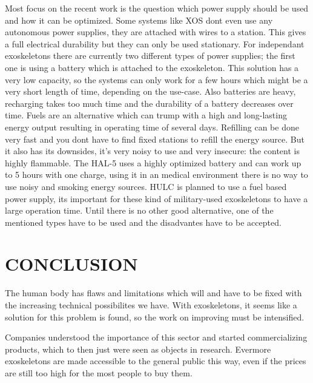 \documentclass[letterpaper, 10 pt, conference]{ieeeconf}  %
\begin{document}

Most focus on the recent work is the question which power supply should be used and how it can be optimized. Some systems like XOS dont even use any autonomous power supplies, they are attached with wires to a station. This gives a full electrical durability but they can only be used stationary. For independant exoskeletons there are currently two different types of power supplies; the first one is using a battery which is attached to the exoskeleton. This solution has a very low capacity, so the systems can only work for a few hours which might be a very short length of time, depending on the use-case. Also batteries are heavy, recharging takes too much time and the durability of a battery decreases over time. Fuels are an alternative which can trump with a high and long-lasting energy output resulting in operating time of several days. Refilling can be done very fast and you dont have to find fixed stations to refill the energy source. But it also has its downsides, it's very noisy to use and very insecure: the content is highly flammable. The HAL-5 uses a highly optimized battery and can work up to 5 hours with one charge, using it in an medical environment there is no way to use noisy and smoking energy sources. HULC is planned to use a fuel based power supply, its important for these kind of military-used exoskeletons to have a large operation time. Until there is no other good alternative, one of the mentioned types have to be used and the disadvantes have to be accepted.
 

\section{CONCLUSION}

The human body has flaws and limitations which will and have to be fixed with the increasing technical possibilites we have. With exoskeletons, it seems like a solution for this problem is found, so the work on improving must be intensified.


Companies understood the importance of this sector and started commercializing products, which to then just were seen as objects in research. Evermore exoskeletons are made accessible to the general public this way, even if the prices are still too high for the most people to buy them.
\end{document}
